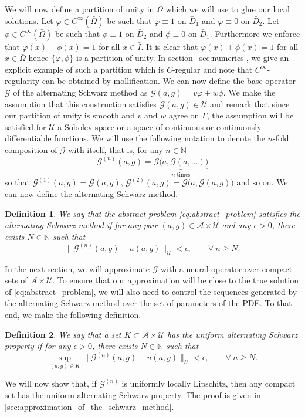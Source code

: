 \documentclass[preprint,11pt]{elsarticle}
\newtheorem{definition}{Definition}
\theoremstyle{plain}
\newcommand{\N}{\mathbb{N}}
\newcommand{\G}{\mathcal{G}}
\newcommand{\A}{\mathcal{A}}
\newcommand{\U}{\mathcal{U}}
\begin{document}
We will now define a partition of unity in $\bar{\Omega}$ which we will use to glue our local solutions.
Let $\varphi \in C^\infty(\bar{\Omega})$ be such that $\varphi \equiv 1$ on $\bar{D}_1$ and $\varphi \equiv 0$ on $\bar{D}_2$. Let $\phi \in C^\infty (\bar{\Omega})$ be such that $\phi \equiv 1$ on $\bar{D}_2$ and $\phi \equiv 0$ on $\bar{D}_1$. Furthermore we enforce that $\varphi(x) + \phi(x) = 1$ for all $x \in \bar{I}$. It is clear that $\varphi(x) + \phi(x) = 1$ for all $x \in \bar{\Omega}$ hence $\{\varphi, \phi\}$ is a partition of unity. In section~\ref{sec:numerics}, we give an explicit example of such a partition which is $C$-regular and note that $C^\infty$-regularity can be obtained by mollification. We can now define the base operator $\G$ of the alternating Schwarz method as $\G(a,g) = v \varphi + w \phi$. We make the assumption that this construction satisfies $\G(a,g) \in \U$ and remark that since our partition of unity is smooth and $v$ and $w$ agree on $\Gamma$, the assumption will be satisfied for $\U$ a Sobolev space or a space of continuous or continuously differentiable functions. We will use the following notation to denote the $n$-fold composition of $\G$ with itself, that is, for any $n \in \N$
\begin{equation}\label{eq:G-composition}
\G^{(n)}(a,g) = \underbrace{\G \big( a, \G(a, \dots ) \big )}_{n \text{ times}}
\end{equation}
so that $\G^{(1)}(a,g) = \G(a,g)$, $\G^{(2)}(a,g) = \G \big (a, \G(a, g) \big)$ and so on. We can now define the alternating Schwarz method.
\begin{definition}
    We say that the abstract problem \eqref{eq:abstract_problem} satisfies the \textit{alternating Schwarz method} if for any pair $(a,g) \in \A \times \U$ and any $\epsilon > 0$, there exists $N \in \N$ such that
    \begin{equation}
        \|\G^{(n)}(a,g) - u(a,g) \|_\U < \epsilon, \qquad \forall \: n \geq N.
    \end{equation}
\end{definition}

In the next section, we will approximate $\G$ with a neural operator over compact sets of $\A \times \U$. To ensure that our approximation will be close to the true solution of \eqref{eq:abstract_problem}, we will also need to control the sequences generated by the alternating Schwarz method over the set of parameters of the PDE. To that end, we make the following definition.
\begin{definition}
    We say that a set $K \subset \A \times \U$ has the \textit{uniform alternating Schwarz property} if for any $\epsilon > 0$, there exists $N \in \N$ such that
    \begin{equation}
        \sup_{(a,g) \in K} \|\G^{(n)}(a,g) - u(a,g) \|_\U < \epsilon, \qquad \forall \: n \geq N.
    \end{equation}
\end{definition}
We will now show that, if $\G^{(n)}$ is uniformly locally Lipschitz, then any compact set has the uniform alternating Schwarz property. The proof is given in \ref{sec:approximation_of_the_schwarz_method}.
\end{document}
